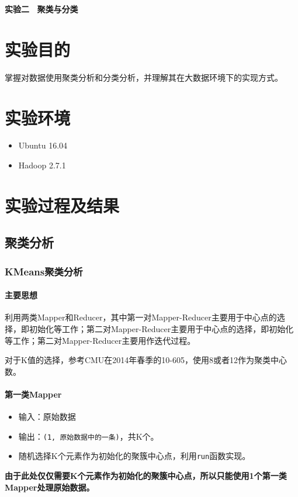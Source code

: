 \documentclass{ML}
\begin{document}
\maketitle

\tableofcontents
\newpage

\begin{center}
    \textbf{ 实验二 \  聚类与分类}
\end{center}

\section{实验目的}
掌握对数据使用聚类分析和分类分析，并理解其在大数据环境下的实现方式。
\section{实验环境}
\begin{itemize}
    \item Ubuntu 16.04
    \item Hadoop 2.7.1
\end{itemize}
\section{实验过程及结果}
\subsection{聚类分析}
\subsubsection{KMeans聚类分析}
\paragraph{主要思想}
利用两类Mapper和Reducer，其中第一对Mapper-Reducer主要用于中心点的选择，即初始化等工作；第二对Mapper-Reducer主要用于中心点的选择，即初始化等工作；第二对Mapper-Reducer主要用作迭代过程。

对于K值的选择，参考CMU在2014年春季的10-605\cite{kmeans-mr-k}，使用8或者12作为聚类中心数。
\paragraph{第一类Mapper}
\begin{itemize}
    \item 输入：原始数据
    \item 输出：\texttt{(1, 原始数据中的一条)}，共K个。
    \item 随机选择K个元素作为初始化的聚簇中心点，利用\texttt{run}函数实现。
\end{itemize}
\textbf{由于此处仅仅需要K个元素作为初始化的聚簇中心点，所以只能使用1个第一类Mapper处理原始数据。}
\end{document}
